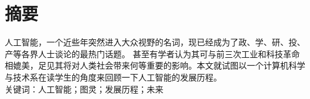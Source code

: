 \documentclass[12pt]{ctexart}
\begin{document}

\tableofcontents
\pagebreak


\section{摘要}
人工智能，一个近些年突然进入大众视野的名词，现已经成为了政、学、研、投、产等各界人士谈论的最热门话题。
甚至有学者认为其可与前三次工业和科技革命相媲美，足见其将对人类社会带来何等重要的影响。本文就试图以一个计算机科学与技术系在读学生的角度来回顾一下人工智能的发展历程。\\
$\textbf{关键词}$：人工智能；图灵；发展历程；未来
\end{document}
